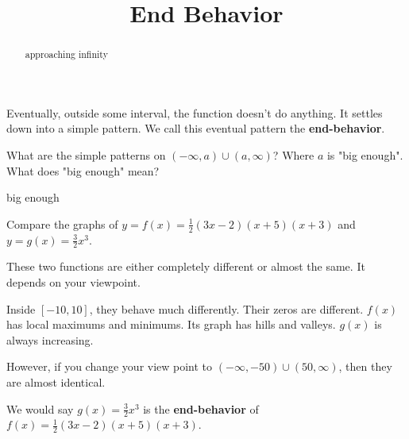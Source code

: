 \documentclass{ximera}
\title{End Behavior}
\begin{document}
\begin{abstract}
approaching infinity
\end{abstract}
\maketitle







Eventually, outside some interval, the function doesn't do anything.  It settles down into a simple pattern.  We call this eventual pattern the \textbf{end-behavior}.



What are the simple patterns on $(-\infty, a) \cup (a, \infty)$?  Where $a$ is "big enough".  What does "big enough" mean?




\begin{example} big enough





Compare the graphs of $y = f(x) = \frac{1}{2}(3x-2)(x+5)(x+3)$ and $y=g(x) = \frac{3}{2}x^3$.



\begin{center}
\end{center}







\begin{center}
\end{center}







These two functions are either completely different or almost the same.  It depends on your viewpoint.

Inside $[-10, 10]$, they behave much differently. Their zeros are different.  $f(x)$ has local maximums and minimums.  Its graph has hills and valleys.  $g(x)$ is always increasing.

However, if you change your view point to $(-\infty, -50) \cup (50, \infty)$, then they are almost identical.


We would say $g(x) = \frac{3}{2}x^3$ is the \textbf{end-behavior} of $f(x) = \frac{1}{2}(3x-2)(x+5)(x+3)$.






\end{example}
\end{document}
